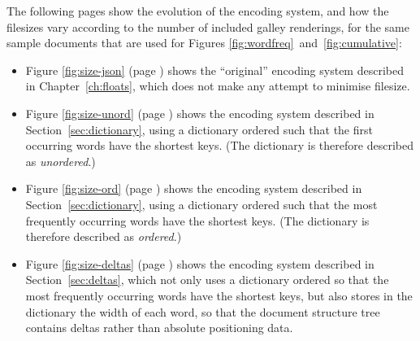 The following pages show the evolution of the encoding system, and how the filesizes vary according to the number of included galley renderings, for the same sample documents that are used for Figures \ref{fig:wordfreq}~and~\ref{fig:cumulative}:

\begin{itemize}

 \item Figure \ref{fig:size-json} (page \pageref{fig:size-json}) shows the ``original'' encoding system described in Chapter~\ref{ch:floats}, which does not make any attempt to minimise filesize.

 \item Figure \ref{fig:size-unord} (page \pageref{fig:size-unord}) shows the encoding system described in Section~\ref{sec:dictionary}, using a dictionary ordered such that the first occurring words have the shortest keys. (The dictionary is therefore described as \emph{unordered}.)

 \item Figure \ref{fig:size-ord} (page \pageref{fig:size-ord}) shows the encoding system described in Section~\ref{sec:dictionary}, using a dictionary ordered such that the most frequently occurring words have the shortest keys. (The dictionary is therefore described as \emph{ordered}.)

 \item Figure \ref{fig:size-deltas} (page \pageref{fig:size-deltas}) shows the encoding system described in Section~\ref{sec:deltas}, which not only uses a dictionary ordered so that the most frequently occurring words have the shortest keys, but also stores in the dictionary the width of each word, so that the document structure tree contains deltas rather than absolute positioning data.
 
\end{itemize}



